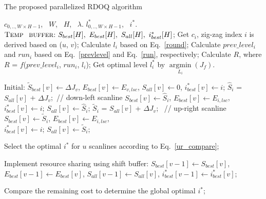 \documentclass[lettersize,journal]{IEEEtran}
\begin{document}
\begin{algorithm}[!ht]
  \renewcommand{\algorithmicrequire}{\textbf{Input:}}
  \renewcommand{\algorithmicensure}{\textbf{Output:}}
  \caption{The proposed parallelized RDOQ algorithm}
  \label{the proposed LNPD algorithm}
	\begin{algorithmic}[1] %
	\REQUIRE  $c_{0,..,W \times H-1}$, \ $W$, \ $H$, \ $\lambda$.      %
	\ENSURE $l_{0,..,W \times H-1}^{*}$, \ $i_{}^{*}$. \\      %
	\STATE $\textsc{Temp \ buffer:} \ S_{best}[H], \ E_{best}[H], \ S_{all}[H], \ i_{best}^{*}[H]$;
	\STATE Get $c_{i}$, zig-zag index $i$ is derived based on ($u$, $v$);
	\STATE Calculate $l_{i}$ based on Eq.~\eqref{round};
	\STATE Calculate $prev\_level_{i}$ and $run_{i}$ based on Eq.~\eqref{prevlevel} and Eq.~\eqref{run}, respectively;
	\STATE Calculate $R$, where $R$ = $f$\;($prev\_level_{i}$, $run_{i}$, $l_{i}$);
	\STATE Get optimal level $l_{i}^{*}$ by $ \mathop{\arg\min}\limits_{ L_{i} } \left ( J_{f} \right) $.

		\STATE Initial: $\widetilde{S}_{best}[v] \gets \Delta J_{v}$, ${E}_{best}[v] \gets E_{v,lsc}$, ${S}_{all}[v] \gets 0$, $i_{best}^{*}[v] \gets i$;
	\ELSE
		    \STATE $\hat{S}_{i}$ = ${S}_{all}[v]$ +  $\Delta{J}_{v}$;\ // down-left scanline
	    	\STATE ${S}_{best}[v] \gets \hat{S}_{i}$, ${E}_{best}[v] \gets {E}_{i,lsc}$, \\ $i_{best}^{*}[v] \gets i$;
		    \ENDIF
		    \STATE ${S}_{all}[v] \gets \hat{S}_{i}$;
		\ELSE 
	    	\STATE $\widetilde{S}_{i}$ = ${S}_{all}[v]$ + $\Delta{J}_{v}$; \ // up-right scanline
	    	\STATE ${S}_{best}[v] \gets \widetilde{S}_{i}$, ${E}_{best}[v] \gets {E}_{i,lsc}$, \\ $i_{best}^{*}[v] \gets i$;
	    	\ENDIF
	    	\STATE ${S}_{all}[v] \gets \widetilde{S}_{i}$;
		\ENDIF
	\ENDIF
	
	\ENDFOR       %
	\STATE Select the optimal $i_{}^{*}$ for $u$ scanlines according to Eq.~\eqref{ur_compare};
	
	\STATE Implement resource sharing using shift buffer: ${S}_{best}[v-1] \gets {S}_{best}[v]$, ${E}_{best}[v-1] \gets {E}_{best}[v]$, ${S}_{all}[v-1] \gets {S}_{all}[v]$, ${i}_{best}^{*}[v-1] \gets {i}_{best}^{*}[v]$;
	\ENDFOR
	
	\ENDFOR       %

	\STATE Compare the remaining cost to determine the global optimal $i_{}^{*}$;
	\ENDFOR
	\end{algorithmic}
\end{algorithm}
\end{document}
